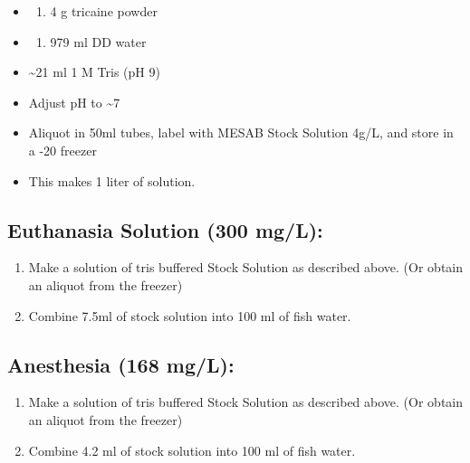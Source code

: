 \documentclass[
]{book}
\providecommand{\tightlist}{%
  \setlength{\itemsep}{0pt}\setlength{\parskip}{0pt}}
\begin{document}
\begin{itemize}
\item
  \begin{enumerate}
  \def\labelenumi{\arabic{enumi}.}
  \tightlist
  \item
    4 g tricaine powder
  \end{enumerate}
\item
  \begin{enumerate}
  \def\labelenumi{\arabic{enumi}.}
  \setcounter{enumi}{1}
  \tightlist
  \item
    979 ml DD water
  \end{enumerate}
\item
  \textasciitilde21 ml 1 M Tris (pH 9)
\item
  Adjust pH to \textasciitilde7\\
\item
  Aliquot in 50ml tubes, label with MESAB Stock Solution 4g/L, and store in a -20 freezer
\item
  This makes 1 liter of solution.
\end{itemize}

\hypertarget{euthanasia-solution-300-mgl}{%
\subsection{Euthanasia Solution (300 mg/L):}\label{euthanasia-solution-300-mgl}}

\begin{enumerate}
\def\labelenumi{\arabic{enumi}.}
\tightlist
\item
  Make a solution of tris buffered Stock Solution as described above. (Or obtain an aliquot from the freezer)
\item
  Combine 7.5ml of stock solution into 100 ml of fish water.
\end{enumerate}

\hypertarget{anesthesia-168-mgl}{%
\subsection{Anesthesia (168 mg/L):}\label{anesthesia-168-mgl}}

\begin{enumerate}
\def\labelenumi{\arabic{enumi}.}
\tightlist
\item
  Make a solution of tris buffered Stock Solution as described above. (Or obtain an aliquot from the freezer)
\item
  Combine 4.2 ml of stock solution into 100 ml of fish water.
\end{enumerate}
\end{document}
